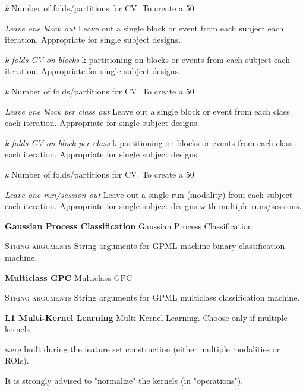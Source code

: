 \textit{k}
Number of folds/partitions for CV. To create a 50%


\textit{Leave one block out}
Leave out a single block or event from each subject each iteration. Appropriate for single subject designs.


\textit{k-folds CV on blocks}
k-partitioning on blocks or events from each subject each iteration. Appropriate for single subject designs.


\textit{k}
Number of folds/partitions for CV. To create a 50%


\textit{Leave one block per class out}
Leave out a single block or event from each class each iteration. Appropriate for single subject designs.


\textit{k-folds CV on block per class}
k-partitioning on blocks or events from each class each iteration. Appropriate for single subject designs.


\textit{k}
Number of folds/partitions for CV. To create a 50%


\textit{Leave one run/session out}
Leave out a single run (modality) from each subject each iteration. Appropriate for single subject designs with multiple runs/sessions.


\textbf{Gaussian Process Classification}
Gaussian Process Classification


\textsc{String arguments}
String arguments for GPML machine binary classification machine.


\textbf{Multiclass GPC}
Multiclass GPC


\textsc{String arguments}
String arguments for GPML multiclass classification machine.


\textbf{L1 Multi-Kernel Learning}
Multi-Kernel Learning. Choose only if multiple kernels 

were built during the feature set construction (either multiple modalities or ROIs). 

It is strongly advised to "normalize" the kernels (in "operations").


